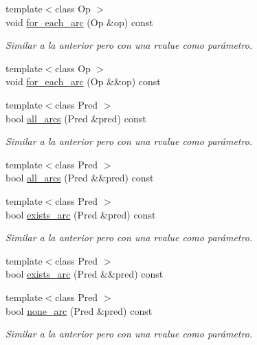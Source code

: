 \begin{DoxyCompactItemize}
\item 
{\footnotesize template$<$class Op $>$ }\\void \hyperlink{class_designar_1_1_base_graph_ac46a1a7517a6c7029c6bae23d480cfa9}{for\+\_\+each\+\_\+arc} (Op \&op) const
\begin{DoxyCompactList}\small\item\em Similar a la anterior pero con una rvalue como parámetro. \end{DoxyCompactList}\item 
{\footnotesize template$<$class Op $>$ }\\void \hyperlink{class_designar_1_1_base_graph_ae76905d5baebd62d0fc481efc7c20f66}{for\+\_\+each\+\_\+arc} (Op \&\&op) const
\item 
{\footnotesize template$<$class Pred $>$ }\\bool \hyperlink{class_designar_1_1_base_graph_a3e2a55dafde6b1edf42f88f4c7d066b8}{all\+\_\+arcs} (Pred \&pred) const
\begin{DoxyCompactList}\small\item\em Similar a la anterior pero con una rvalue como parámetro. \end{DoxyCompactList}\item 
{\footnotesize template$<$class Pred $>$ }\\bool \hyperlink{class_designar_1_1_base_graph_aea71a873faf7e92195d582b21d14c347}{all\+\_\+arcs} (Pred \&\&pred) const
\item 
{\footnotesize template$<$class Pred $>$ }\\bool \hyperlink{class_designar_1_1_base_graph_aaed186c42ed6b51f761cda959ecde601}{exists\+\_\+arc} (Pred \&pred) const
\begin{DoxyCompactList}\small\item\em Similar a la anterior pero con una rvalue como parámetro. \end{DoxyCompactList}\item 
{\footnotesize template$<$class Pred $>$ }\\bool \hyperlink{class_designar_1_1_base_graph_aebf517d972db553b03f2c4dbe4228d79}{exists\+\_\+arc} (Pred \&\&pred) const
\item 
{\footnotesize template$<$class Pred $>$ }\\bool \hyperlink{class_designar_1_1_base_graph_a023f28dd8824ba7a0c26342effd0fddf}{none\+\_\+arc} (Pred \&pred) const
\begin{DoxyCompactList}\small\item\em Similar a la anterior pero con una rvalue como parámetro. \end{DoxyCompactList}\item 

\end{DoxyCompactItemize}

